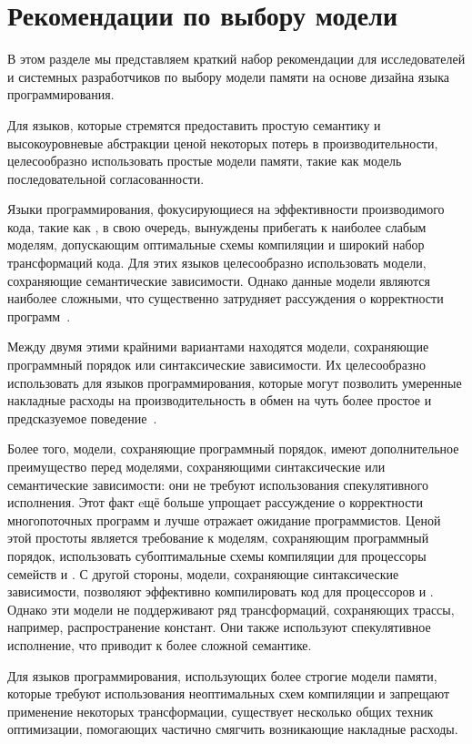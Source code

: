 \section{Рекомендации по выбору модели}
\label{sec:discussion}

В этом разделе мы  представляем краткий набор рекомендации для 
исследователей и системных разработчиков 
по выбору модели памяти на основе дизайна языка программирования.

Для языков, которые стремятся предоставить простую семантику 
и высокоуровневые абстракции ценой некоторых потерь в 
производительности, целесообразно использовать простые модели памяти, такие как 
модель последовательной согласованности. 

Языки программирования, фокусирующиеся на 
эффективности производимого кода, 
такие как \CPP, в свою очередь, вынуждены 
прибегать к наиболее слабым моделям, 
допускающим оптимальные схемы компиляции и 
широкий набор трансформаций кода. 
Для этих языков целесообразно использовать
модели, сохраняющие семантические зависимости. 
Однако данные модели являются наиболее сложными, 
что существенно затрудняет рассуждения о 
корректности программ~\cite{Svendsen-al:ESOP18}. 

Между двумя этими крайними вариантами  находятся модели, 
сохраняющие программный порядок или синтаксические зависимости. 
Их целесообразно использовать для языков программирования, 
которые могут позволить умеренные накладные 
расходы на производительность в обмен 
на чуть более простое и предсказуемое поведение~\cite{Ou-Demsky:OOPSLA18}. 

Более того, модели, сохраняющие программный порядок, 
имеют дополнительное преимущество перед моделями, 
сохраняющими синтаксические или семантические зависимости: они не требуют использования 
спекулятивного исполнения. 
Этот факт eщё больше упрощает рассуждение о корректности 
многопоточных программ и лучше отражает ожидание программистов. 
Ценой этой простоты является требование к моделям, сохраняющим программный порядок, 
использовать субоптимальные схемы компиляции 
для процессоры семейств \ARM и \POWER.
С другой стороны, модели, сохраняющие синтаксические зависимости, 
позволяют эффективно компилировать код для процессоров \ARM и \POWER. Однако
эти модели не поддерживают ряд трансформаций, 
сохраняющих трассы, например, распространение констант. Они также используют спекулятивное исполнение, 
что приводит к более сложной семантике.  

Для языков программирования, использующих более строгие модели памяти, 
которые требуют использования неоптимальных схем компиляции 
и запрещают применение некоторых трансформации, 
существует несколько общих техник оптимизации, 
помогающих частично смягчить возникающие накладные расходы. 

